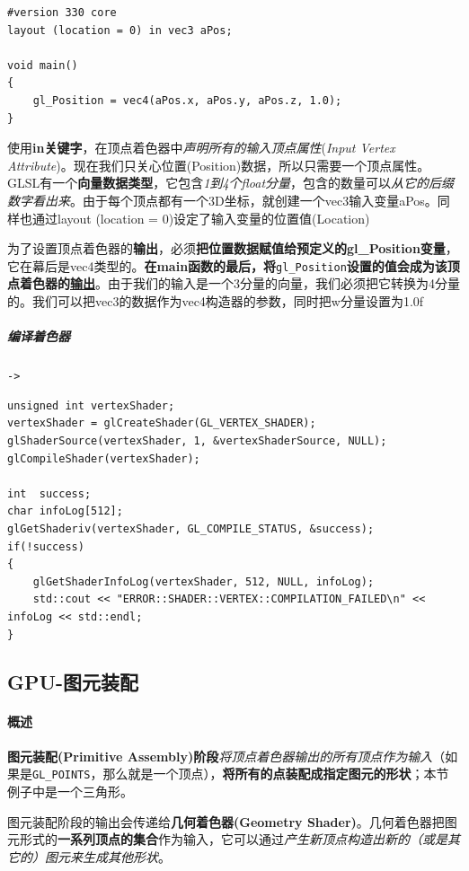 \documentclass[UTF8,a4paper,12pt]{ctexbook}
\begin{document}
					\begin{lstlisting}
#version 330 core
layout (location = 0) in vec3 aPos;

void main()
{
    gl_Position = vec4(aPos.x, aPos.y, aPos.z, 1.0);
}				
					\end{lstlisting}
					
					使用\textbf{in关键字}，在顶点着色器中\textit{声明所有的输入顶点属性}(\textit{Input Vertex Attribute})。现在我们只关心位置(Position)数据，所以只需要一个顶点属性。GLSL有一个\textbf{向量数据类型}，它包含\textit{1到4个float分量}，包含的数量可以\textit{从它的后缀数字看出来}。由于每个顶点都有一个3D坐标，就创建一个vec3输入变量aPos。同样也通过layout (location = 0)设定了输入变量的位置值(Location)
					
					为了设置顶点着色器的\textbf{输出}，必须\textbf{把位置数据赋值给预定义的gl\_Position变量}，它在幕后是vec4类型的。\textbf{在main函数的最后，将}\verb|gl_Position|\textbf{设置的值会成为该顶点着色器的\underline{输出}}。由于我们的输入是一个3分量的向量，我们必须把它转换为4分量的。我们可以把vec3的数据作为vec4构造器的参数，同时把w分量设置为1.0f
				
				
				\subparagraph{编译着色器}\verb|->|
				
					\begin{lstlisting}
unsigned int vertexShader;
vertexShader = glCreateShader(GL_VERTEX_SHADER);
glShaderSource(vertexShader, 1, &vertexShaderSource, NULL);
glCompileShader(vertexShader);	

int  success;
char infoLog[512];
glGetShaderiv(vertexShader, GL_COMPILE_STATUS, &success);	
if(!success)
{
    glGetShaderInfoLog(vertexShader, 512, NULL, infoLog);
    std::cout << "ERROR::SHADER::VERTEX::COMPILATION_FAILED\n" << infoLog << std::endl;
}				
					\end{lstlisting}
				
				
				
		\subsection{GPU-图元装配}
			\paragraph{概述}		
				\textbf{图元装配(Primitive Assembly)阶段}\textit{将顶点着色器输出的所有顶点作为输入}（如果是\verb|GL_POINTS|，那么就是一个顶点），\textbf{将所有的点装配成指定图元的形状}；本节例子中是一个三角形。
			
				图元装配阶段的输出会传递给\textbf{几何着色器(Geometry Shader)}。几何着色器把图元形式的\textbf{一系列顶点的集合}作为输入，它可以通过\textit{产生新顶点构造出新的（或是其它的）图元来生成其他形状}。
			
\end{document}
